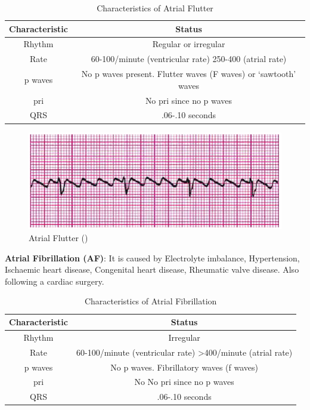 \begin{table}[H]
\begin{center}
\begin{tabular}{||c || c||}
 \hline
\textbf{Characteristic} & \textbf{Status} \\ [0.4ex] 
 \hline\hline
 Rhythm & Regular or irregular \\
\hline
Rate & 60-100/minute (ventricular rate) 250-400 (atrial rate)\\
\hline
p waves & No p waves present. Flutter waves (F waves) or ‘sawtooth’ waves \\
\hline
pri & No pri since no p waves \\
\hline
QRS & .06-.10 seconds \\
\hline\hline
\end{tabular}
\end{center}
\caption{Characteristics of Atrial Flutter}
\label{table:AFL_characteristics}
\end{table}

 \begin{figure}[H]
\centering
\includegraphics[scale=0.9]{img/AFL.png}
\caption{Atrial Flutter (\cite{arryth_types})}
\label{fig:AFL}
\end{figure}

\textbf{Atrial Fibrillation (AF)}: It is caused by Electrolyte imbalance, Hypertension, Ischaemic heart disease, Congenital heart disease, Rheumatic valve disease. Also following a cardiac surgery.

\begin{table}[H]
\begin{center}
\begin{tabular}{||c || c||}
 \hline
\textbf{Characteristic} & \textbf{Status} \\ [0.4ex] 
 \hline\hline
 Rhythm & Irregular \\
\hline
Rate & 60-100/minute (ventricular rate) >400/minute (atrial rate)\\
\hline
p waves & No p waves. Fibrillatory waves (f waves) \\
\hline
pri & No No pri since no p waves \\
\hline
QRS & .06-.10 seconds \\
\hline\hline
\end{tabular}
\end{center}
\caption{Characteristics of Atrial Fibrillation}
\label{table:AF_characteristics}
\end{table}

